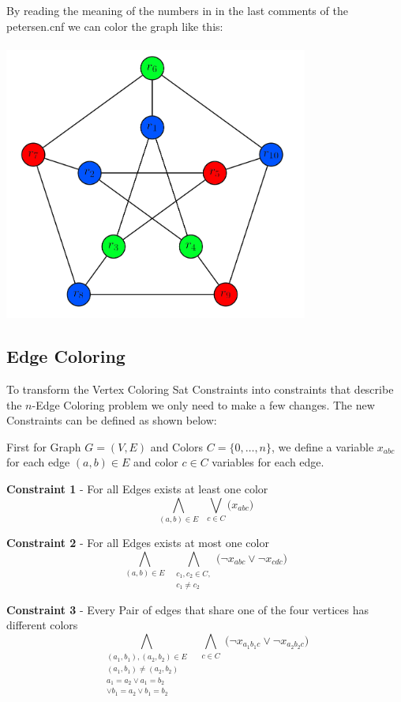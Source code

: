 \documentclass{../base/base}
\begin{document}
By reading the meaning of the numbers in in the last comments of the petersen.cnf we can color the graph like this:\\ \\
\includegraphics[width=10cm]{petersen_colored.png}


\clearpage
\subsection{Edge Coloring}
To transform the Vertex Coloring Sat Constraints into constraints that describe the $n$-Edge Coloring problem we only need to make a few changes. The new Constraints can be defined as shown below:


First for Graph $G = (V,E)$ and Colors $C =\{0,\dots,n\}$, we define a variable $x_{abc}$ for each edge $(a,b) \in E$ and color $c \in C$ variables for each edge.


\textbf{Constraint 1} - For all Edges exists at least one color
$$ \bigwedge_{(a,b) \in E} 
\ \ 
\bigvee_{c \in C} \big(x_{abc}\big)$$

\textbf{Constraint 2} - For all Edges exists at most one color
$$ \bigwedge_{(a,b) \in E} 
\ \ 
\bigwedge_{\substack{c_1,c_2 \in C,\\ c_1 \neq c_2}} 
\big( \neg x_{abc} \lor \neg x_{cdc} \big)$$

\textbf{Constraint 3} - Every Pair of edges that share one of the four vertices has different colors
$$ 
\bigwedge_{\substack{(a_1,b_1),(a_2,b_2) \in E \\ 
                    (a_1,b_1)\neq(a_2,b_2) \\ 
                    a_1=a_2  \lor  a_1=b_2 \\ \lor b_1=a_2 \lor b_1=b_2}} 
\ \ 
\bigwedge_{\substack{c \in C}} 
                    \big( \neg x_{a_1b_1c} \lor \neg x_{a_2b_2c} \big)$$
\end{document}
